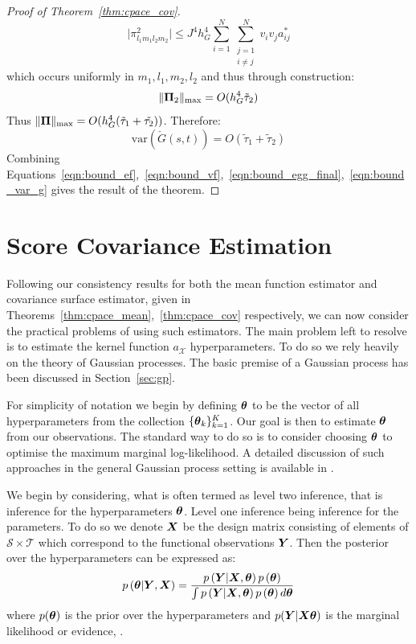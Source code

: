 \begin{proof}[Proof of Theorem~\ref{thm:cpace_cov}]
\begin{equation}
	\lvert \pi_{l_1m_1l_2m_2}^2  \rvert \leq J^4 h_G^4 \sum_{i=1}^N \sum_{\substack{j=1 \\ i \ne j}}^N v_i v_j a_{ij}^* 
\end{equation}
which occurs uniformly in $m_1, l_1, m_2, l_2$ and thus through construction:
\begin{equation}
	\lVert \bm{{\Pi}}_{2} \rVert_\text{max} = O(h_G^4 \tilde{\tau}_2)
\end{equation}
Thus $\lVert \bm{{\Pi}} \rVert_\text{max} = O(h_G^4(\tilde{\tau}_1 + \tilde{\tau_2}))$.
Therefore:
\begin{equation}
	\text{var}\left(\check{G}(s,t)\right) = O(\tilde{\tau}_1 + \tilde{\tau}_2)
	\label{eqn:bound_var_g}
\end{equation}
Combining Equations~\eqref{eqn:bound_ef},~\eqref{eqn:bound_vf},~\eqref{eqn:bound_egg_final},~\eqref{eqn:bound_var_g} gives the result of the theorem.
\end{proof}

\section{Score Covariance Estimation \label{sec:cpace_score_estim}}
Following our consistency results for both the mean function estimator and covariance surface estimator, given in Theorems~\ref{thm:cpace_mean},~\ref{thm:cpace_cov} respectively, we can now consider the practical problems of using such estimators.
The main problem left to resolve is to estimate the kernel function $a_\mathcal{X}$  hyperparameters. 
To do so we rely heavily on the theory of Gaussian processes. 
The basic premise of a Gaussian process has been discussed in Section~\ref{sec:gp}.

For simplicity of notation we begin by defining $\bm{{\theta}}$ to be the vector of all hyperparameters from the collection $\{\bm{{\theta}}_{k}\}_{k=1}^K$. 
Our goal is then to estimate $\bm{{\theta}}$ from our observations. 
The standard way to do so is to consider choosing $\bm{{\theta}}$ to optimise the maximum marginal log-likelihood. 
A detailed discussion of such approaches in the general Gaussian process setting is available in \citep{williams_gaussian_2006}.

We begin by considering, what is often termed as level two inference, that is inference for the hyperparameters $\bm{{\theta}}$. 
Level one inference being inference for the parameters. 
To do so we denote $\bm{{X}}$ be the design matrix consisting of elements of $\mathcal{S} \times \mathcal{T}$ which correspond to the functional observations $\bm{{Y}}$. 
Then the posterior over the hyperparameters can be expressed as:
\begin{equation}
	p\left(\bm{{\theta}} | \bm{{Y}},  \bm{{X}} \right) = \frac{p\left(\bm{{Y}} | \bm{{X}}, \bm{{\theta}}\right) p\left(\bm{{\theta}}\right)}{\int p\left(\bm{{Y}} | \bm{{X}}, \bm{{\theta}}\right) p\left(\bm{{\theta}}\right) d\bm{{\theta}}} 
	\label{eqn:bayes_cpace}
\end{equation}
where $p(\bm{{\theta}})$ is the prior over the hyperparameters and $p(\bm{{Y}}| \bm{{X}} \bm{{\theta}})$ is the marginal likelihood or evidence, \citep{williams_gaussian_2006}.

